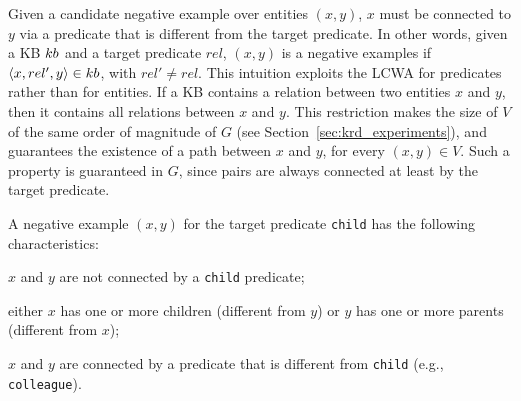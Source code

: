 Given a candidate negative example over entities $(x,y)$, $x$ must be connected to $y$ via a predicate that is different from the target predicate. In other words, given a KB ${\sc kb}$ and a target predicate $rel$, $(x,y)$ is a negative examples if $\langle x,rel',y\rangle \in {\sc kb}$, with $rel' \neq rel$. This intuition exploits the LCWA for predicates rather than for entities. If a KB contains a relation between two entities $x$ and $y$, then it contains all relations between $x$ and $y$.
This restriction makes the size of $V$ of the same order of magnitude of $G$ (see Section~\ref{sec:krd_experiments}), and guarantees the existence of a path between $x$ and $y$, for every $(x,y) \in V$. 
Such a property is guaranteed in $G$, since pairs are always connected at least by the target predicate.

\begin{example}
	A negative example $(x,y)$ for the target predicate \texttt{child} has the following characteristics:
	\begin{inparaenum}[\itshape(i)]
		\item $x$ and $y$ are not connected by a \texttt{child} predicate;
		\item either $x$ has one or more children (different from $y$) or $y$ has one or more parents (different from $x$);
		\item $x$ and $y$ are connected by a predicate that is different from \texttt{child} (e.g., \texttt{colleague}).
	\end{inparaenum}
\end{example}

